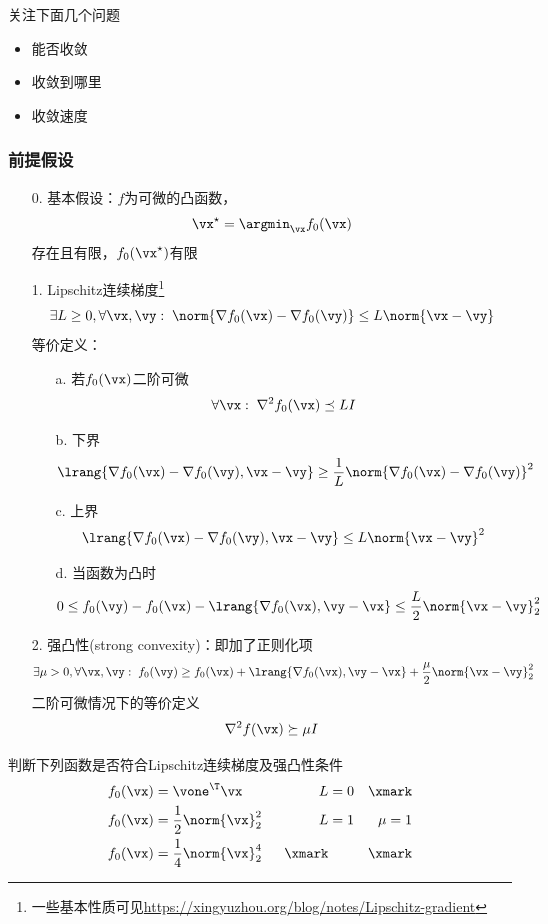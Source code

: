 关注下面几个问题
\begin{itemize}
    \item 能否收敛
    \item 收敛到哪里
    \item 收敛速度
\end{itemize}

\subsubsection{前提假设}
\begin{itemize}
    \item[0.] 基本假设：$f$为可微的凸函数，
    \[\vx^\star=\argmin_\vx f_0(\vx)\]
    存在且有限，$f_0(\vx^\star)$有限
    \item[1.] Lipschitz连续梯度\footnote{一些基本性质可见\url{https://xingyuzhou.org/blog/notes/Lipschitz-gradient}}
    \[\exists L\geq 0,\forall \vx,\vy:\;\norm{\nabla f_0(\vx)-\nabla f_0(\vy)}\leq L\norm{\vx-\vy}\]
    等价定义：
    \begin{itemize}
        \item[a.]若$f_0(\vx)$二阶可微
    \[\forall \vx:\;\nabla^2f_0(\vx)\preceq LI\]
        \item[b.] 下界
    \[\lrang{\nabla f_0(\vx)-\nabla f_0(\vy),\vx-\vy}\geq\frac{1}{L}\norm{\nabla f_0(\vx)-\nabla f_0(\vy)}^2\]
        \item[c.] 上界
    \[\lrang{\nabla f_0(\vx)-\nabla f_0(\vy),\vx-\vy}\leq L\norm{\vx-\vy}^2\]
        \item[d.] 当函数为凸时
    \[0\leq f_0(\vy)-f_0(\vx)-\lrang{\nabla f_0(\vx),\vy-\vx}\leq\frac{L}{2}\norm{\vx-\vy}_2^2\]
    \end{itemize}
    \item[2.] 强凸性(strong convexity)：即加了正则化项
    \[\exists\mu>0,\forall \vx,\vy:\;f_0(\vy)\geq f_0(\vx)+\lrang{\nabla f_0(\vx),\vy-\vx}+\frac{\mu}{2}\norm{\vx-\vy}_2^2\]
    二阶可微情况下的等价定义
    \[\nabla^2 f(\vx)\succeq \mu I\]
\end{itemize}
\begin{example}
    判断下列函数是否符合Lipschitz连续梯度及强凸性条件
    \[\begin{aligned}
        f_0(\vx) &= \vone^\T \vx\qquad & L &= 0 & \text{\xmark}\\
        f_0(\vx) &= \frac{1}{2}\norm{\vx}_2^2 & L &=1 & \mu=1\\
        f_0(\vx) &= \frac{1}{4}\norm{\vx}_2^4 & \text{\xmark} & &\text{\xmark}
    \end{aligned}\]
\end{example}

